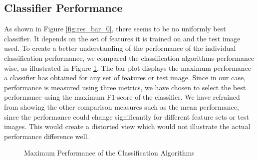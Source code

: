 \subsection{Classifier Performance}

As shown in Figure \ref{fig:res_bar_0}, there seems to be no uniformly best classifier. It depends on the set of features it is trained on and the test image used. To create a better understanding of the performance of the individual classification performance, we compared the classification algorithms performance wise, as illustrated in Figure \ref{fig:res_bar_1}. The bar plot displays the maximum performance a classifier has obtained for any set of features or test image. Since in our case, performance is measured using three metrics, we have chosen to select the best performance using the maximum F1-score of the classifier. We have refrained from showing the other comparison measures such as the mean performance, since the performance could change significantly for different feature sets or test images. This would create a distorted view which would not illustrate the actual performance difference well. 


\dataone

\begin{figure}
	\caption{Maximum Performance of the Classification Algorithms}
	\label{fig:res_bar_1}
\end{figure}

